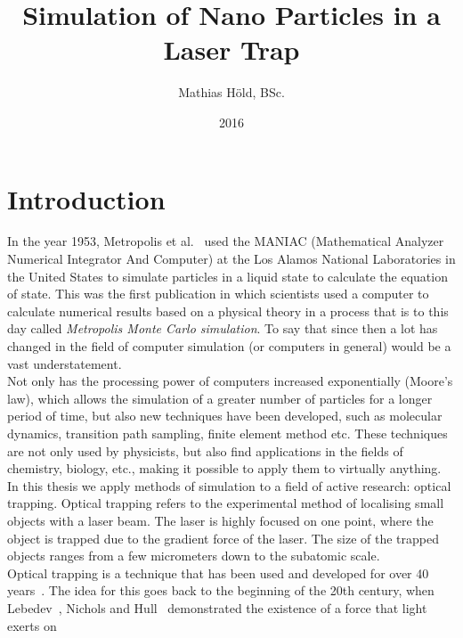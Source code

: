 \documentclass[12pt]{article}
\begin{document}
\title{Simulation of Nano Particles in a Laser Trap}
\author{Mathias H\"old, BSc.}
\date{2016}
\maketitle
\thispagestyle{empty}
\newpage
\tableofcontents
\newpage
\section{Introduction}
In the year 1953, Metropolis et al.~\cite{Metropolis1953} used the MANIAC (Mathematical Analyzer Numerical Integrator And Computer) 
at the Los Alamos National Laboratories in the United States to
simulate particles in a liquid state to calculate the equation of state. This was the first publication in which scientists used a computer to
calculate numerical results based on a physical theory in a process that is to this day called \textit{Metropolis Monte Carlo simulation}. 
To say that since then a lot has
changed in the field of computer simulation (or computers in general) would be a vast understatement.\\
Not only has the processing power of computers increased exponentially (Moore's law), which allows the simulation of a greater number of particles for
a longer period of time, but also new techniques have been developed, such as molecular dynamics, transition path sampling, finite element method etc. 
These techniques are not only used by physicists,
but also find applications in the fields of chemistry, biology, etc., making it possible to apply them to virtually anything. In this thesis we 
apply methods of simulation to a field of active research: optical trapping. 
Optical trapping refers to the experimental method of localising small objects with a laser beam. The laser is highly focused on one point, where 
the object is trapped due to the gradient force of the laser. The size of the trapped objects ranges from a few micrometers down to the subatomic 
scale.\\
Optical trapping is a technique that has been used and developed for over 40 years~\cite{Marago2013}. The idea for this goes back to the beginning of
the 20th century, when Lebedev~\cite{Lebedew1901}, Nichols and Hull~\cite{Nichols1901} demonstrated the existence of a force that light exerts on 
\end{document}
